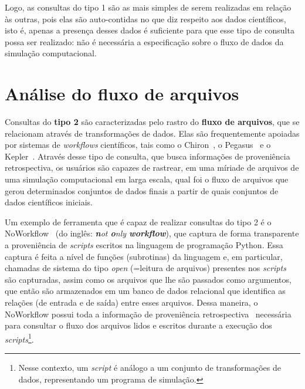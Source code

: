 Logo, as consultas do tipo 1 são as mais simples de serem realizadas em relação às outras, pois elas são auto-contidas no que diz respeito aos dados científicos, isto é, apenas a presença desses dados é suficiente para que esse tipo de consulta possa ser realizado: não é necessária a especificação sobre o fluxo de dados da simulação computacional.

\section{Análise do fluxo de arquivos}%
\label{sec:rastreamento-de-fluxos-de-arquivos}

Consultas do \textbf{tipo 2} são caracterizadas pelo rastro do \textbf{fluxo de arquivos}, que se relacionam através de transformações de dados. Elas são frequentemente apoiadas por sistemas de \textit{workflows} científicos, tais como o Chiron~\cite{ogasawara2011algebraic}, o Pegasus~\cite{deelman2005pegasus} e o Kepler~\cite{ludascher2006scientific}. Através desse tipo de consulta, que busca informações de proveniência retrospectiva, os usuários são capazes de rastrear, em uma míriade de arquivos de uma simulação computacional em larga escala, qual foi o fluxo de arquivos que gerou determinados conjuntos de dados finais a partir de quais conjuntos de dados científicos iniciais.

Um exemplo de ferramenta que é capaz de realizar consultas do tipo 2 é o NoWorkflow~\cite{murta2014noworkflow} (do inglês: \textit{\textbf{n}ot \textbf{o}nly \textbf{workflow}}), que captura de forma transparente a proveniência de \textit{scripts} escritos na linguagem de programação Python. Essa captura é feita a nível de funções (subrotinas) da linguagem e, em particular, chamadas de sistema do tipo \emph{open} (=leitura de arquivos) presentes nos \textit{scripts} são capturadas, assim como os arquivos que lhe são passados como argumentos, que então são armazenados em um banco de dados relacional que identifica as relações (de entrada e de saída) entre esses arquivos. Dessa maneira, o NoWorkflow possui toda a informação de proveniência retrospectiva~\cite{Pimentel2016} necessária para consultar o fluxo dos arquivos lidos e escritos durante a execução dos \textit{scripts}\footnote{Nesse contexto, um \textit{script} é análogo a um conjunto de transformações de dados, representando um programa de simulação.}.

